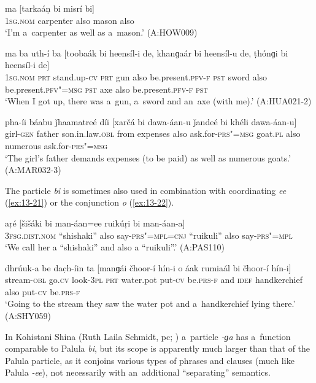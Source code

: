 \begin{exe}
\ex
\label{ex:13-18}
\gll ma [tarkaáṇ bi misrí bi]  \\
\textsc{1sg.nom} carpenter also mason also \\
\glt `I'm a~carpenter as well as a~mason.' (A:HOW009)

\ex
\label{ex:13-19}
\gll ma ba uth-í ba [toobaák bi heensíl-i de, khanɡaár bi heensíl-u de, ṭhónɡi bi heensíl-i de] \\
\textsc{1sg.nom} \textsc{prt} stand.up-\textsc{cv} \textsc{prt} gun also  be.present.\textsc{pfv-f} \textsc{pst} sword also be.present.\textsc{pfv"=msg } \textsc{pst} axe also be.present.\textsc{pfv-f } \textsc{pst} \\
\glt `When I got up, there was a~gun, a~sword and an~axe (with me).' (A:HUA021-2)

\ex
\label{ex:13-20}
\gll pha-íi báabu ǰhaamatreé díi [xarčá bi dawa-áan-u ǰandeé bi khéli dawa-áan-u]  \\
girl-\textsc{gen} father son.in.law.\textsc{obl} from expenses also  ask.for-\textsc{prs"=msg} goat.\textsc{pl} also numerous ask.for-\textsc{prs"=msg} \\
\glt `The girl's father demands expenses (to be paid) as well as numerous goats.' (A:MAR032-3) 
\end{exe}

The particle \textit{bi} is sometimes also used in combination with coordinating \textit{ee} (\ref{ex:13-21}) or the conjunction \textit{o} (\ref{ex:13-22}).

\begin{exe}
\ex
\label{ex:13-21}
\gll aṛé  [šišáki  bi man-áan=ee  ruikúṛi bi man-áan-a] \\
\textsc{3fsg.dist.nom} ``shishaki'' also say-\textsc{prs"=mpl=cnj}  ``ruikuli'' also say-\textsc{prs"=mpl}\\
\glt `We call her a ``shishaki'' and also a ``ruikuli''.' (A:PAS110)

\ex
\label{ex:13-22}
\gll dhrúuk-a be dac̣h-íin ta [manɡái čhoor-í hín-i o áak rumiaál bi čhoor-í hín-i]  \\
stream-\textsc{obl} go.\textsc{cv} look-\textsc{3pl} \textsc{prt} water.pot put-\textsc{cv}  be.\textsc{prs-f} and \textsc{idef } handkerchief also put-\textsc{cv} be.\textsc{prs-f } \\
\glt `Going to the stream they saw the water pot and a~handkerchief lying there.' (A:SHY059) 
\end{exe}

In Kohistani Shina (Ruth Laila Schmidt, pc; \citealt[252]{schmidtkohistani2008}) a~particle \textit{-ɡa} has a~function comparable to Palula \textit{bi}, but its scope is apparently much larger than that of the Palula particle, as it conjoins various types of phrases and clauses (much like Palula \textit{-ee}), not necessarily with an~additional ``separating'' semantics. 



